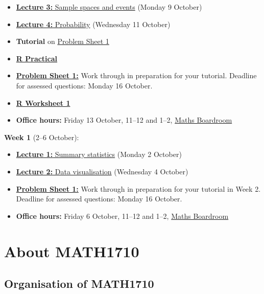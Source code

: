 \documentclass[
  a4paper,
]{book}
\providecommand{\tightlist}{%
  \setlength{\itemsep}{0pt}\setlength{\parskip}{0pt}}
\theoremstyle{definition}
\theoremstyle{definition}
\theoremstyle{definition}
\theoremstyle{definition}
\theoremstyle{remark}
\begin{document}
\begin{itemize}
\tightlist
\item
  \protect\hyperlink{L03-events}{\textbf{Lecture 3:} Sample spaces and events} (Monday 9 October)
\item
  \protect\hyperlink{L04-probability}{\textbf{Lecture 4:} Probability} (Wednesday 11 October)
\item
  \textbf{Tutorial} on \protect\hyperlink{P1}{Problem Sheet 1}
\item
  \protect\hyperlink{practical}{\textbf{R Practical}}
\item
  \protect\hyperlink{P1}{\textbf{Problem Sheet 1:}} Work through in preparation for your tutorial. Deadline for assessed questions: Monday 16 October.
\item
  \protect\hyperlink{R}{\textbf{R Worksheet 1}}
\item
  \textbf{Office hours:} Friday 13 October, 11--12 and 1--2, \href{boardroom.png}{Maths Boardroom}
\end{itemize}

\textbf{Week 1} (2--6 October):

\begin{itemize}
\tightlist
\item
  \protect\hyperlink{L01-stats}{\textbf{Lecture 1:} Summary statistics} (Monday 2 October)
\item
  \protect\hyperlink{L02-dataviz}{\textbf{Lecture 2:} Data visualisation} (Wednesday 4 October)
\item
  \protect\hyperlink{P1}{\textbf{Problem Sheet 1:}} Work through in preparation for your tutorial in Week 2. Deadline for assessed questions: Monday 16 October.
\item
  \textbf{Office hours:} Friday 6 October, 11--12 and 1--2, \href{boardroom.png}{Maths Boardroom}
\end{itemize}

\hypertarget{about}{%
\chapter*{About MATH1710}\label{about}}

\hypertarget{organisation}{%
\section*{Organisation of MATH1710}\label{organisation}}
\end{document}
